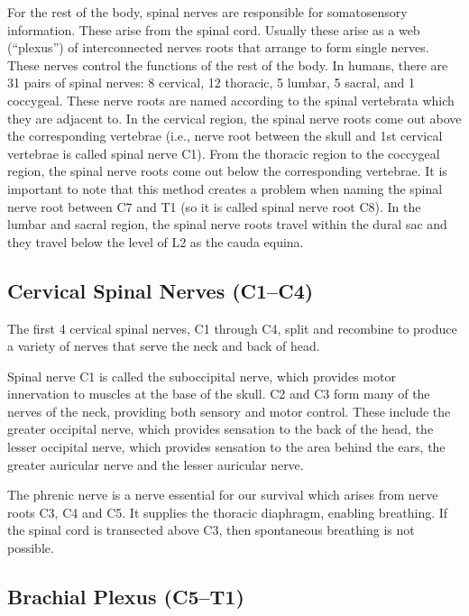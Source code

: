 \documentclass[]{book}
\begin{document}
For the rest of the body, spinal nerves are responsible for somatosensory information. These arise from the spinal cord. Usually these arise as a web (``plexus'') of interconnected nerves roots that arrange to form single nerves. These nerves control the functions of the rest of the body. In humans, there are 31 pairs of spinal nerves: 8 cervical, 12 thoracic, 5 lumbar, 5 sacral, and 1 coccygeal. These nerve roots are named according to the spinal vertebrata which they are adjacent to. In the cervical region, the spinal nerve roots come out above the corresponding vertebrae (i.e., nerve root between the skull and 1st cervical vertebrae is called spinal nerve C1). From the thoracic region to the coccygeal region, the spinal nerve roots come out below the corresponding vertebrae. It is important to note that this method creates a problem when naming the spinal nerve root between C7 and T1 (so it is called spinal nerve root C8). In the lumbar and sacral region, the spinal nerve roots travel within the dural sac and they travel below the level of L2 as the cauda equina.

\hypertarget{cervical-spinal-nerves-c1c4}{%
\subsection{Cervical Spinal Nerves (C1--C4)}\label{cervical-spinal-nerves-c1c4}}

The first 4 cervical spinal nerves, C1 through C4, split and recombine to produce a variety of nerves that serve the neck and back of head.

Spinal nerve C1 is called the suboccipital nerve, which provides motor innervation to muscles at the base of the skull. C2 and C3 form many of the nerves of the neck, providing both sensory and motor control. These include the greater occipital nerve, which provides sensation to the back of the head, the lesser occipital nerve, which provides sensation to the area behind the ears, the greater auricular nerve and the lesser auricular nerve.

The phrenic nerve is a nerve essential for our survival which arises from nerve roots C3, C4 and C5. It supplies the thoracic diaphragm, enabling breathing. If the spinal cord is transected above C3, then spontaneous breathing is not possible.

\hypertarget{brachial-plexus-c5t1}{%
\subsection{Brachial Plexus (C5--T1)}\label{brachial-plexus-c5t1}}
\end{document}
